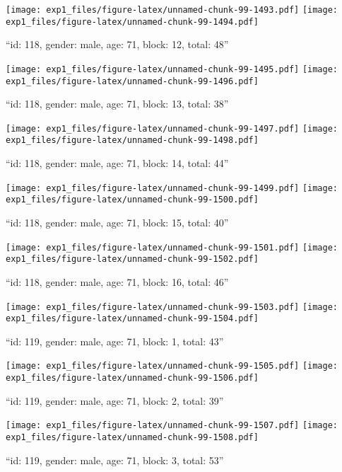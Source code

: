 \documentclass[,]{article}
\begin{document}
\texttt{[image: exp1\_files/figure-latex/unnamed-chunk-99-1493.pdf]}
\texttt{[image: exp1\_files/figure-latex/unnamed-chunk-99-1494.pdf]}

\newpage
[1] 

``id: 118, gender: male, age: 71, block: 12, total: 48''

\texttt{[image: exp1\_files/figure-latex/unnamed-chunk-99-1495.pdf]}
\texttt{[image: exp1\_files/figure-latex/unnamed-chunk-99-1496.pdf]}

\newpage
[1] 

``id: 118, gender: male, age: 71, block: 13, total: 38''

\texttt{[image: exp1\_files/figure-latex/unnamed-chunk-99-1497.pdf]}
\texttt{[image: exp1\_files/figure-latex/unnamed-chunk-99-1498.pdf]}

\newpage
[1] 

``id: 118, gender: male, age: 71, block: 14, total: 44''

\texttt{[image: exp1\_files/figure-latex/unnamed-chunk-99-1499.pdf]}
\texttt{[image: exp1\_files/figure-latex/unnamed-chunk-99-1500.pdf]}

\newpage
[1] 

``id: 118, gender: male, age: 71, block: 15, total: 40''

\texttt{[image: exp1\_files/figure-latex/unnamed-chunk-99-1501.pdf]}
\texttt{[image: exp1\_files/figure-latex/unnamed-chunk-99-1502.pdf]}

\newpage
[1] 

``id: 118, gender: male, age: 71, block: 16, total: 46''

\texttt{[image: exp1\_files/figure-latex/unnamed-chunk-99-1503.pdf]}
\texttt{[image: exp1\_files/figure-latex/unnamed-chunk-99-1504.pdf]}

\newpage
[1] 

``id: 119, gender: male, age: 71, block: 1, total: 43''

\texttt{[image: exp1\_files/figure-latex/unnamed-chunk-99-1505.pdf]}
\texttt{[image: exp1\_files/figure-latex/unnamed-chunk-99-1506.pdf]}

\newpage
[1] 

``id: 119, gender: male, age: 71, block: 2, total: 39''

\texttt{[image: exp1\_files/figure-latex/unnamed-chunk-99-1507.pdf]}
\texttt{[image: exp1\_files/figure-latex/unnamed-chunk-99-1508.pdf]}

\newpage
[1] 

``id: 119, gender: male, age: 71, block: 3, total: 53''
\end{document}
